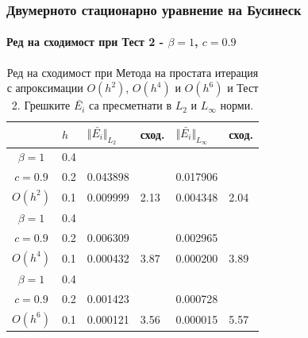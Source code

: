 \documentclass{beamer}
\begin{document}
\begin{frame}
\frametitle{Двумерното стационарно уравнение на Бусинеск}
\framesubtitle{Ред на сходимост при Тест 2 - $\beta = 1$, $c=0.9$}

\begin{table}[ht]
\centering
		\begin{tabular}{||c|l|ll|ll||}
			\hline
			\hline
             & $h$  &  	$\Vert \bar{ E_i} \Vert_{L_2}$ 	& сход.	& $\Vert \bar{ E_i}\Vert_{L_\infty}$  		&сход.   \\
   					\hline 					
			\hline 	
$\beta = 1$   	&0.4   &             &           &                & \\
     $c=0.9$     &0.2   &  0.043898  &             & 0.017906      &    \\
     $O(h^2)$	&0.1  & 0.009999 & 2.13       & 0.004348      & 2.04  \\
\hline 	
 $\beta = 1$   	&0.4  &            &               &               &     \\
     $c=0.9$  	&0.2   & 0.006309  &              & 0.002965      &        \\
     $O(h^4)$	&0.1  &  0.000432 &3.87        & 0.000200 &  3.89        \\
    \hline
 $\beta = 1$	&0.4   &             &        &               &        \\
   $ c=0.9$  	&0.2   &  0.001423  &        & 0.000728      &       \\
       $O(h^6)$	&0.1  &   0.000121 &3.56  & 0.000015 &   5.57       \\
	   \hline
			\hline 
		\end{tabular}
		\caption{Ред на сходимост при Метода на простата итерация с апроксимации $O(h^{2})$, $O(h^{4})$ и $O(h^{6})$ и Тест 2. Грешките $\bar{ E_i}$ са пресметнати в $L_2$ и $L_\infty$ норми.}
\label{tab:aB}
\end{table}

\end{frame}
\end{document}
